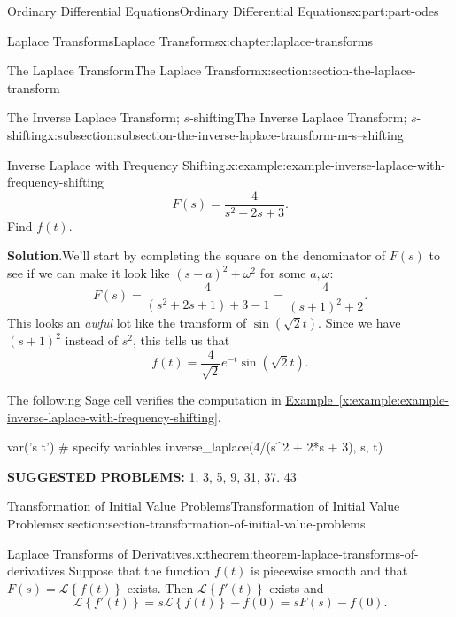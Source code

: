 \documentclass[oneside,10pt,]{book}
\newcommand{\blocktitlefont}{\relax}
\newcommand{\xreffont}{\relax}
\newcommand{\terminology}[1]{\textbf{#1}}
\numberwithin{equation}{part}
\newcommand{\Laplace}[1]{\mathcal{L}\left\{#1\right\}}
\begin{document}
\begin{partptx}{Ordinary Differential Equations}{}{Ordinary Differential Equations}{}{}{x:part:part-odes}
\begin{chapterptx}{Laplace Transforms}{}{Laplace Transforms}{}{}{x:chapter:laplace-transforms}
\begin{sectionptx}{The Laplace Transform}{}{The Laplace Transform}{}{}{x:section:section-the-laplace-transform}
\begin{subsectionptx}{The Inverse Laplace Transform; \(s\)-shifting}{}{The Inverse Laplace Transform; \(s\)-shifting}{}{}{x:subsection:subsection-the-inverse-laplace-transform-m-s--shifting}
\begin{example}{Inverse Laplace with Frequency Shifting.}{x:example:example-inverse-laplace-with-frequency-shifting}
\begin{equation*}
F(s) = \frac{4}{s^{2}+2s+3}.
\end{equation*}
Find \(f(t)\).%
\par\smallskip%
\noindent\textbf{\blocktitlefont Solution}.\hypertarget{g:solution:idp105548781446816}{}\quad{}We'll start by completing the square on the denominator of \(F(s)\) to see if we can make it look like \((s-a)^{2}+\omega^{2}\) for some \(a,\omega\):%
\begin{equation*}
F(s) = \frac{4}{(s^{2}+2s+1)+3-1} = \frac{4}{(s+1)^{2}+2}.
\end{equation*}
This looks an \emph{awful} lot like the transform of \(\sin(\sqrt{2}t)\). Since we have \((s+1)^{2}\) instead of \(s^{2}\), this tells us that%
\begin{equation*}
f(t) = \frac{4}{\sqrt{2}}e^{-t}\sin(\sqrt{2}t).
\end{equation*}
%
\end{example}
The following Sage cell verifies the computation in \hyperref[x:example:example-inverse-laplace-with-frequency-shifting]{Example~{\xreffont\ref{x:example:example-inverse-laplace-with-frequency-shifting}}}.%
\begin{sageinput}
var('s t') # specify variables
inverse_laplace(4/(s^2 + 2*s + 3), s, t)
\end{sageinput}
\terminology{SUGGESTED PROBLEMS:} 1, 3, 5, 9, 31, 37. 43\end{subsectionptx}
\end{sectionptx}
%
%
\typeout{************************************************}
\typeout{************************************************}
%
\begin{sectionptx}{Transformation of Initial Value Problems}{}{Transformation of Initial Value Problems}{}{}{x:section:section-transformation-of-initial-value-problems}
\begin{theorem}{Laplace Transforms of Derivatives.}{}{x:theorem:theorem-laplace-transforms-of-derivatives}%
Suppose that the function \(f(t)\) is piecewise smooth and that \(F(s) = \Laplace{f(t)}\) exists. Then \(\Laplace{f'(t)}\) exists and%
\begin{equation*}
\Laplace{f'(t)} = s\Laplace{f(t)}-f(0) = sF(s)-f(0).
\end{equation*}
%
\end{theorem}

\end{sectionptx}
\end{chapterptx}
\end{partptx}
\end{document}
